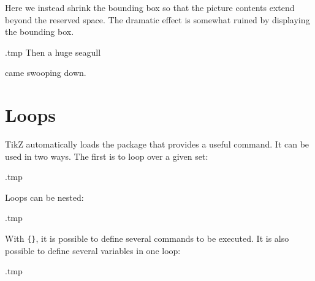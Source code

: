 Here we instead shrink the bounding box
so that the picture contents extend beyond the reserved space.
The dramatic effect is somewhat ruined by displaying the bounding box.
%
\begin{VerbatimOut}{\jobname.tmp}
\centering
Then a huge seagull
came swooping down.
\end{VerbatimOut}
\ShowExampleBelow[2]



%
%
\section{Loops}

TikZ automatically loads the  package that provides a useful  command.
It can be used in two ways.
The first is to loop over a given set:
%
\begin{VerbatimOut}{\jobname.tmp}
\centering
{}
\end{VerbatimOut}
\ShowExampleBelow[2]
%
Loops can be nested:
%
\begin{VerbatimOut}{\jobname.tmp}
\centering
{}
\end{VerbatimOut}
\ShowExampleBelow[2]
With \verb|{}|, it is possible to define several commands to be executed.
It is also possible to define several variables in one loop:
%
\begin{VerbatimOut}{\jobname.tmp}
\centering
{}
\end{VerbatimOut}
\ShowExampleBelow[2]


